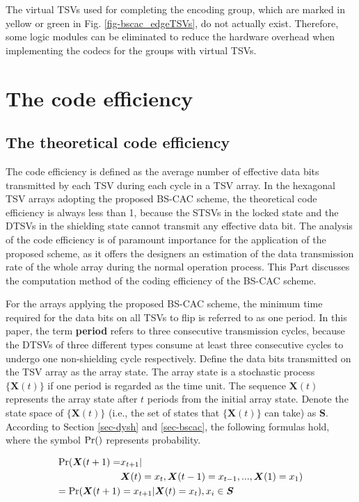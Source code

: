 \documentclass[lettersize,journal]{IEEEtran}
\begin{document}
The virtual TSVs used for completing the encoding group, which are marked in yellow or green in Fig. \ref{fig-bscac_edgeTSVs}, do not actually exist. Therefore, some logic modules can be eliminated to reduce the hardware overhead when implementing the codecs for the groups with virtual TSVs.

\section{The code efficiency}\label{sec-code_rate}
\subsection{The theoretical code efficiency}\label{subsec-code_rate-calc}
The code efficiency is defined as the average number of effective data bits transmitted by each TSV during each cycle in a TSV array. In the hexagonal TSV arrays adopting the proposed BS-CAC scheme, the theoretical code efficiency is always less than 1, because the STSVs in the locked state and the DTSVs in the shielding state cannot transmit any effective data bit. The analysis of the code efficiency is of paramount importance for the application of the proposed scheme, as it offers the designers an estimation of the data transmission rate of the whole array during the normal operation process. This Part discusses the computation method of the coding efficiency of the BS-CAC scheme.

For the arrays applying the proposed BS-CAC scheme, the minimum time required for the data bits on all TSVs to flip is referred to as one period. In this paper, the term \textbf{period} refers to three consecutive transmission cycles, because the DTSVs of three different types consume at least three consecutive cycles to undergo one non-shielding cycle respectively. Define the data bits transmitted on the TSV array as the array state. The array state is a stochastic process $\{\boldsymbol{X}(t)\}$ if one period is regarded as the time unit. The sequence $\boldsymbol{X}(t)$ represents the array state after $t$ periods from the initial array state. Denote the state space of $\{\boldsymbol{X}(t)\}$ (i.e., the set of states that $\{\boldsymbol{X}(t)\}$ can take) as $\boldsymbol{S}$. According to Section \ref{sec-dysh} and \ref{sec-bscac}, the following formulas hold, where the symbol $\rm Pr()$ represents probability.

\begin{equation}
	\begin{aligned}
		{\rm Pr}( \boldsymbol{X}(t+1) = &x_{t+1} | \\
		&\boldsymbol{X}(t)=x_t, \boldsymbol{X}(t-1)=x_{t-1}, ...,\boldsymbol{X}(1)=x_1 ) \\
		={\rm Pr}( \boldsymbol{X}(t+1) &= x_{t+1} | \boldsymbol{X}(t)=x_t ), x_i \in \boldsymbol{S}
	\end{aligned}
	\label{eq-5.2.1}
\end{equation}
\end{document}
